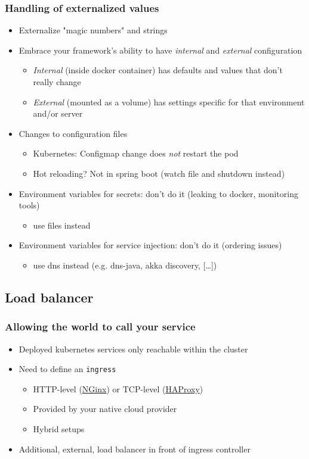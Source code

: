 \documentclass[8pt]{article}
\begin{document}
\subsubsection{Handling of externalized values}
\label{sec:org04211b4}
\begin{itemize}
\item Externalize "magic numbers" and strings
\item Embrace your framework's ability to have \emph{internal} and \emph{external} configuration
\begin{itemize}
\item \emph{Internal} (inside docker container) has defaults and values that don't really change
\item \emph{External} (mounted as a volume) has settings specific for that environment and/or server
\end{itemize}
\item Changes to configuration files
\begin{itemize}
\item Kubernetes: Configmap change does \emph{not} restart the pod
\item Hot reloading? Not in spring boot (watch file and shutdown instead)
\end{itemize}
\item Environment variables for secrets: don't do it (leaking to docker, monitoring tools)
\begin{itemize}
\item use files instead
\end{itemize}
\item Environment variables for service injection: don't do it (ordering issues)
\begin{itemize}
\item use dns instead (e.g. dns-java, akka discovery, [\ldots{}])
\end{itemize}
\end{itemize}
\subsection{Load balancer}
\label{sec:orgcb29288}
\subsubsection{Allowing the world to call your service}
\label{sec:org4fb5dc0}
\begin{itemize}
\item Deployed kubernetes services only reachable within the cluster
\item Need to define an \texttt{ingress}
\begin{itemize}
\item HTTP-level (\href{https://github.com/nginxinc/kubernetes-ingress}{NGinx}) or TCP-level (\href{https://github.com/haproxytech/kubernetes-ingress}{HAProxy})
\item Provided by your native cloud provider
\item Hybrid setups
\end{itemize}
\item Additional, external, load balancer in front of ingress controller
\end{itemize}
\end{document}
